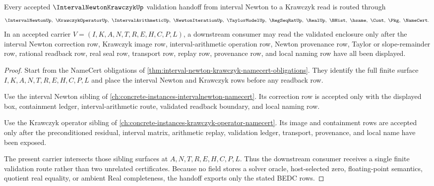 \begin{theorem}
\label{thm:interval-newton-krawczyk-validation-handoff}
Every accepted $\IntervalNewtonKrawczykUp$ validation handoff from interval Newton to a Krawczyk read is routed through
$$
\IntervalNewtonUp,\ \KrawczykOperatorUp,\ \IntervalArithmeticUp,\ \NewtonIterationUp,\ \TaylorModelUp,\ \RegSeqRatUp,\ \RealUp,\ \BHist,\ \hsame,\ \Cont,\ \Pkg,\ \NameCert.
$$
In an accepted carrier $V=(I,K,A,N,T,R,E,H,C,P,L)$, a downstream consumer may read the validated enclosure only after the interval Newton correction row, Krawczyk image row, interval-arithmetic operation row, Newton provenance row, Taylor or slope-remainder row, rational readback row, real seal row, transport row, replay row, provenance row, and local naming row have all been displayed.
\end{theorem}
\begin{proof}
Start from the NameCert obligations of \autoref{thm:interval-newton-krawczyk-namecert-obligations}. They identify the full finite surface $I,K,A,N,T,R,E,H,C,P,L$ and place the interval Newton and Krawczyk rows before any readback row.

Use the interval Newton sibling of \autoref{ch:concrete-instances-intervalnewton-namecert}. Its correction row is accepted only with the displayed box, containment ledger, interval-arithmetic route, validated readback boundary, and local naming row.

Use the Krawczyk operator sibling of \autoref{ch:concrete-instances-krawczyk-operator-namecert}. Its image and containment rows are accepted only after the preconditioned residual, interval matrix, arithmetic replay, validation ledger, transport, provenance, and local name have been exposed.

The present carrier intersects those sibling surfaces at $A,N,T,R,E,H,C,P,L$. Thus the downstream consumer receives a single finite validation route rather than two unrelated certificates. Because no field stores a solver oracle, host-selected zero, floating-point semantics, quotient real equality, or ambient Real completeness, the handoff exports only the stated BEDC rows.
\end{proof}


